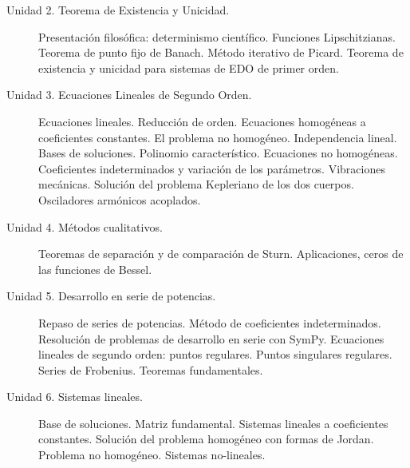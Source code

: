\documentclass[12pt]{article}
\begin{document}
\begin{enumerate}
\begin{description}
\item[Unidad 2. Teorema de Existencia y Unicidad.] Presentación filosófica: determinismo científico. Funciones Lipschitzianas. Teorema de punto fijo de Banach. Método iterativo de Picard. Teorema de existencia y unicidad para sistemas de EDO de primer orden.\cite{simmons_esp, WilliamE.Boyce496, VladimirI.Arnold544, JorgeSotomayor513}

\item[Unidad 3. Ecuaciones Lineales de Segundo Orden.] Ecuaciones lineales. Reducción de orden. Ecuaciones homogéneas a coeficientes constantes. El problema no homogéneo. Independencia lineal. Bases de soluciones. Polinomio característico. Ecuaciones no homogéneas. Coeficientes indeterminados y variación de los parámetros. Vibraciones mecánicas. Solución del problema Kepleriano de los dos cuerpos. Osciladores armónicos acoplados. \cite{simmons_esp, WilliamE.Boyce496}

\item[Unidad 4. Métodos cualitativos.] Teoremas de separación y de comparación de Sturn. Aplicaciones, ceros de las funciones de Bessel.\cite{simmons_esp,JorgeSotomayor513}

\item[Unidad 5. Desarrollo en serie de potencias.] Repaso de series de potencias. Método de coeficientes indeterminados.  Resolución de problemas de desarrollo en serie con  SymPy.   Ecuaciones lineales de segundo orden: puntos regulares. Puntos singulares regulares. Series de Frobenius. Teoremas fundamentales.\cite{simmons_esp, WilliamE.Boyce496}

\item[Unidad 6.  Sistemas lineales.]  Base de soluciones. Matriz fundamental. Sistemas lineales a coeficientes constantes. Solución del problema homogéneo con formas de Jordan. Problema no homogéneo. Sistemas no-lineales. \cite{ WilliamE.Boyce496,JorgeSotomayor513}

\end{description}


\end{enumerate}
\end{document}
